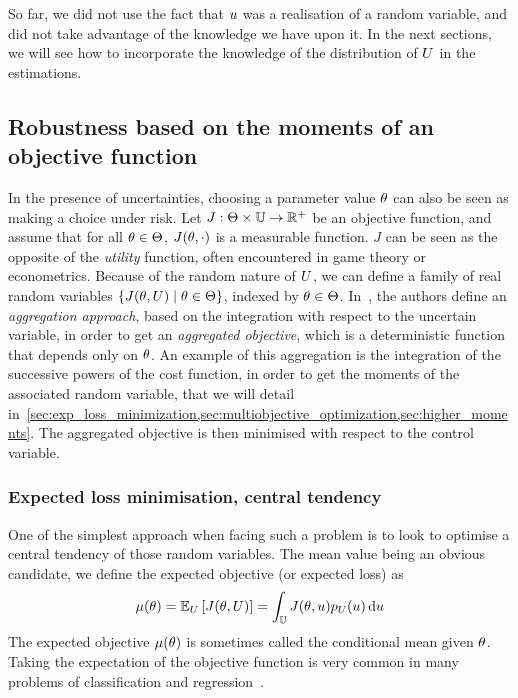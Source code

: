 \documentclass[../../Main_ManuscritThese.tex]{subfiles}
\begin{document}
So far, we did not use the fact that $u$ was a realisation of a
random variable, and did not take advantage of the knowledge we have
upon it. In the next sections, we will see how to incorporate the
knowledge of the distribution of $U$ in the estimations.

\subsection{Robustness based on the moments of an objective function}
In the presence of uncertainties, choosing a parameter value $\theta$ can
also be seen as making a choice under risk. Let
$J:\Theta \times \mathbb{U}\rightarrow \mathbb{R}^+$ be an objective
function, and assume that for all $\theta \in \Theta$, $J(\theta, \cdot)$
is a measurable function.  $J$ can be seen as the opposite of the
\emph{utility} function, often encountered in game theory or
econometrics.  Because of the random nature of $U$, we can define a
family of real random variables $\{J(\theta,U) \mid \theta \in \Theta\}$,
indexed by $\theta \in \Theta$.  In~\cite{beyer_robust_2007}, the
authors define an \emph{aggregation approach}, based on the
integration with respect to the uncertain variable, in order to get an
\emph{aggregated objective}, which is a deterministic function that
depends only on $\theta$.  An example of this aggregation is the
integration of the successive powers of the cost function, in order to
get the moments of the associated random variable, that we will detail
in~\cref{sec:exp_loss_minimization,sec:multiobjective_optimization,sec:higher_moments}.
The aggregated objective is then minimised with respect to the control
variable.
\subsubsection{Expected loss minimisation, central tendency}
\label{sec:exp_loss_minimization}
One of the simplest approach when facing such a problem is to look to
optimise a central tendency of those random variables. The mean value
being an obvious candidate, we define the expected objective (or
expected loss) as
\begin{equation}
  \label{eq:mean_objective}
  \mu(\theta) = \mathbb{E}_U\left[J(\theta,U)\right] =\int_{\mathbb{U}} J(\theta,u)p_U(u)\,\mathrm{d}u
\end{equation}
The expected objective $\mu(\theta)$ is sometimes called the conditional
mean given $\theta$. Taking the expectation of the objective function is
very common in many problems of classification and
regression~\citep{bishop_pattern_2006}.
\end{document}
